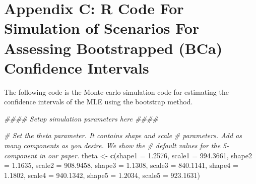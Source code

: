 \documentclass[
]{article}
\newenvironment{Shaded}{\begin{snugshade}}{\end{snugshade}}
\newcommand{\CommentTok}[1]{\textcolor[rgb]{0.56,0.35,0.01}{\textit{#1}}}
\newcommand{\DataTypeTok}[1]{\textcolor[rgb]{0.13,0.29,0.53}{#1}}
\newcommand{\FloatTok}[1]{\textcolor[rgb]{0.00,0.00,0.81}{#1}}
\newcommand{\KeywordTok}[1]{\textcolor[rgb]{0.13,0.29,0.53}{\textbf{#1}}}
\newcommand{\NormalTok}[1]{#1}
\newcommand{\StringTok}[1]{\textcolor[rgb]{0.31,0.60,0.02}{#1}}
\begin{document}
\hypertarget{appendix-c-r-code-for-simulation-of-scenarios-for-assessing-bootstrapped-bca-confidence-intervals}{%
\section*{Appendix C: R Code For Simulation of Scenarios For Assessing
Bootstrapped (BCa) Confidence
Intervals}\label{appendix-c-r-code-for-simulation-of-scenarios-for-assessing-bootstrapped-bca-confidence-intervals}}

The following code is the Monte-carlo simulation code for estimating the
confidence intervals of the MLE using the bootstrap method.

\begin{Shaded}
\begin{Highlighting}[]
\CommentTok{\#\#\#\# Setup simulation parameters here \#\#\#\#}

\CommentTok{\# Set the theta parameter. It contains shape and scale}
\CommentTok{\# parameters. Add as many components as you desire. We show the}
\CommentTok{\# default values for the 5{-}component in our paper.}
\NormalTok{theta \textless{}{-}}\StringTok{ }\KeywordTok{c}\NormalTok{(}\DataTypeTok{shape1 =} \FloatTok{1.2576}\NormalTok{, }\DataTypeTok{scale1 =} \FloatTok{994.3661}\NormalTok{, }\DataTypeTok{shape2 =} \FloatTok{1.1635}\NormalTok{, }\DataTypeTok{scale2 =} \FloatTok{908.9458}\NormalTok{,}
    \DataTypeTok{shape3 =} \FloatTok{1.1308}\NormalTok{, }\DataTypeTok{scale3 =} \FloatTok{840.1141}\NormalTok{, }\DataTypeTok{shape4 =} \FloatTok{1.1802}\NormalTok{, }\DataTypeTok{scale4 =} \FloatTok{940.1342}\NormalTok{,}
    \DataTypeTok{shape5 =} \FloatTok{1.2034}\NormalTok{, }\DataTypeTok{scale5 =} \FloatTok{923.1631}\NormalTok{)}


\end{Highlighting}
\end{Shaded}
\end{document}
